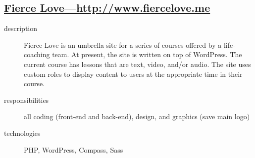 \documentclass{article}
\begin{document}
\newpage

\subsection{\href{http://www.fiercelove.me}
{Fierce Love---http://www.fiercelove.me}}
\label{sub:Fierce Love}

\begin{multicols}{2}

\begin{description}
  \item[description] Fierce Love is an umbrella site for a series of courses offered by a life-coaching team.  At present, the site is written on top of WordPress.  The current course has lessons that are text, video, and/or audio.  The site uses custom roles to display content to users at the appropriate time in their course.
  \item[responsibilities] all coding (front-end and back-end), design, and graphics (save main logo)
  \item[technologies] PHP, WordPress, Compass, Sass
\end{description}

\vfill
\columnbreak
{}
\end{multicols}
\end{document}
